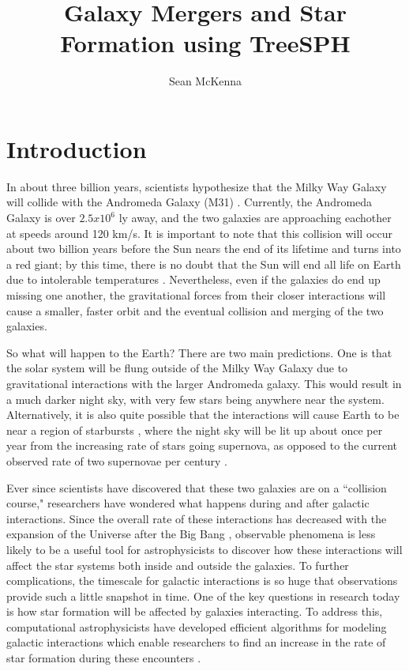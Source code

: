 \documentclass[11pt]{article} %
\title{Galaxy Mergers and Star Formation using TreeSPH}
\author{Sean McKenna}
\begin{document}
\maketitle


\section{Introduction}
	In about three billion years, scientists hypothesize that the Milky Way Galaxy will collide with the Andromeda Galaxy (M31) \cite{andromeda}. Currently, the Andromeda Galaxy is over $2.5x10^6$ ly away, and the two galaxies are approaching eachother at speeds around 120 km/s. It is important to note that this collision will occur about two billion years before the Sun nears the end of its lifetime and turns into a red giant; by this time, there is no doubt that the Sun will end all life on Earth due to intolerable temperatures \cite{andromeda}. Nevertheless, even if the galaxies do end up missing one another, the gravitational forces from their closer interactions will cause a smaller, faster orbit and the eventual collision and merging of the two galaxies.

	So what will happen to the Earth? There are two main predictions. One is that the solar system will be flung outside of the Milky Way Galaxy due to gravitational interactions with the larger Andromeda galaxy. This would result in a much darker night sky, with very few stars being anywhere near the system. Alternatively, it is also quite possible that the interactions will cause Earth to be near a region of starbursts \cite{site}, where the night sky will be lit up about once per year from the increasing rate of stars going supernova, as opposed to the current observed rate of two supernovae per century \cite{andromeda}.

	Ever since scientists have discovered that these two galaxies are on a ``collision course," researchers have wondered what happens during and after galactic interactions. Since the overall rate of these interactions has decreased with the expansion of the Universe after the Big Bang \cite{andromeda}, observable phenomena is less likely to be a useful tool for astrophysicists to discover how these interactions will affect the star systems both inside and outside the galaxies. To further complications, the timescale for galactic interactions is so huge that observations provide such a little snapshot in time. One of the key questions in research today is how star formation will be affected by galaxies interacting. To address this, computational astrophysicists have developed efficient algorithms for modeling galactic interactions which enable researchers to find an increase in the rate of star formation during these encounters \cite{mergers,mergerstats,andromeda,starburst,superwinds}.
\end{document}
